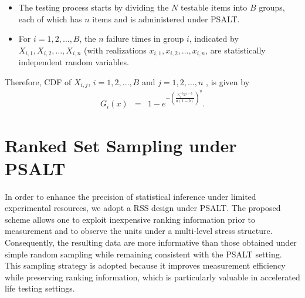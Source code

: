 \documentclass[twoside]{article}
\begin{document}
\begin{itemize}
\item[6.]
The testing process starts by dividing the $N$ testable
items into $B$ groups, each of which has $n$ items and is administered under PSALT.

\item[7.]
For $i=1,2, \dots, B$, the $n$ failure times in group $i$,
indicated by $X_{i,1}, X_{i,2}, \dots, X_{i,n}$ (with realizations $x_{i,1}, x_{i,2}, \dots, x_{i,n}$, are statistically independent random variables.
\end{itemize}

Therefore, CDF of $X_{i,j}$, $i=1,2,\dots,B$ and $j=1,2,\dots,n$ , is given by
\begin{eqnarray}
\label{f5}
G_{i}(x) & =&1-e^{-(\frac{\kappa_i^{-b} x^{1-b}}{ a (1-b)})^{\eta}}.
\end{eqnarray}


\section{Ranked Set Sampling under PSALT}
In order to enhance the precision of statistical inference under limited experimental resources, we adopt a RSS design under PSALT. The proposed scheme allows one to exploit inexpensive ranking information prior to measurement and to observe the units under a multi-level stress structure. Consequently, the resulting data are more informative than those obtained under simple random sampling while remaining consistent with the PSALT setting. This sampling strategy is adopted because it improves measurement efficiency while preserving ranking information, which is particularly valuable in accelerated life testing settings.
\end{document}
